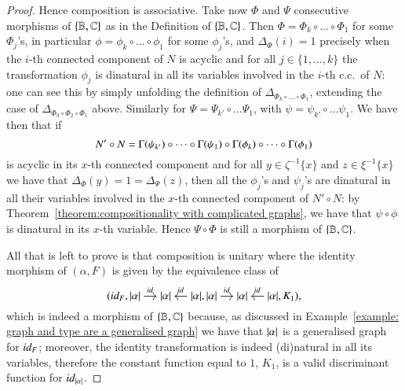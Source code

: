 \begin{proof}
    Hence composition is associative. Take now $\Phi$ and $\Psi$ consecutive morphisms of $\{ \mathbb B,\mathbb C\}$ as in the Definition of $\{ \mathbb B,\mathbb C\}$. Then $\Phi=\Phi_k \circ \dots \circ \Phi_1$ for some $\Phi_j$'s, in particular $\phi=\phi_k \circ \dots \circ \phi_1$ for some $\phi_j$'s, and $\Delta_\Phi (i) =1 $ precisely when the $i$-th connected component of $N$ is acyclic and for all $j \in \{1,\dots,k\}$ the transformation $\phi_j$ is dinatural in all its variables involved in the $i$-th c.c.\ of $N$: one can see this by simply unfolding the definition of $\Delta_{\Phi_k \circ \dots \circ \Phi_1}$, extending the case of $\Delta_{\Phi_3 \circ \Phi_2 \circ \Phi_1}$ above. Similarly for $\Psi=\Psi_{k'} \circ \dots \Psi_1$, with $\psi = \psi_{k'} \circ \dots \psi_1$. We have then that if 
    \[
    N' \circ N = \graph{\psi_{k'}} \circ \dots \circ \graph{\psi_1} \circ \graph{\phi_k} \circ \dots \circ \graph{\phi_1}
    \]
    is acyclic in its $x$-th connected component and for all $y \in \zeta^{-1}\{x\}$ and $z \in \xi^{-1}\{x\}$ we have that $\Delta_\Phi(y) = 1 = \Delta_\Psi(z)$, then all the $\phi_j$'s and $\psi_j$'s are dinatural in all their variables involved in the $x$-th connected component of $N' \circ N$: by Theorem~\ref{theorem:compositionality with complicated graphs}, we have that $\psi\circ\phi$ is dinatural in its $x$-th variable. Hence $\Psi\circ\Phi$ is still a morphism of $\{ \mathbb B,\mathbb C\}$.
    
    All that is left to prove is that composition is unitary where the identity morphism of $(\alpha,F)$ is given by the equivalence class of
    \[
    (
    \id F, 
    \begin{tikzcd}[cramped,sep=small]
    \length\alpha \ar[r,"\id{}"] & \length\alpha & \ar[l,"\id{}"'] \length\alpha
    \end{tikzcd},
    \begin{tikzcd}[cramped,sep=small]
    \length\alpha \ar[r,"\id{}"] & \length\alpha & \ar[l,"\id{}"'] \length\alpha
    \end{tikzcd},
    K_1
    ),
    \]
    which is indeed a morphism of $\{ \mathbb B,\mathbb C\}$ because, %
     as discussed in Example~\ref{example: graph and type are a generalised graph} we have that $\lvert \alpha \rvert$ is a generalised graph for $\mathop{\textit{id}_{F}}$; moreover, the identity transformation is indeed (di)natural in all its variables, therefore the constant function equal to $1$, $K_1$, is a valid discriminant function for $\mathop{\textit{id}_{\lvert \alpha \rvert}}$.
    

\end{proof}
